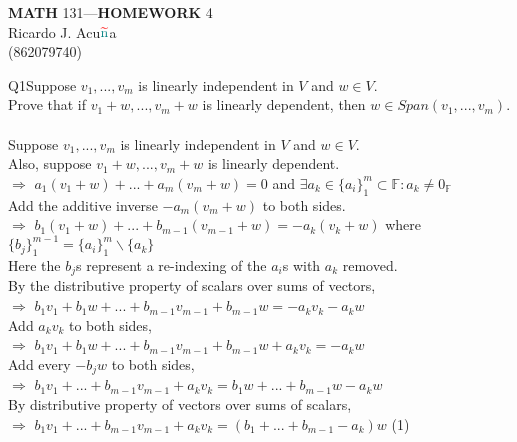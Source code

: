 \documentclass{article}
\begin{document}
\begin{center}
  \textbf{MATH} 131---\textbf{HOMEWORK} 4\\
  \color{red}R\color{teal}icardo
  \color{red}J\color{cyan}.
  \color{red}A\color{teal}cu$\color{red}{\widetilde{\color{teal}\text{n}}}$\color{teal}a\color{black}\\
  \color{teal}(\color{red}862079740\color{teal})\color{black}\\
\end{center}\vspace{1.618cm}

Q1\quad Suppose $v_1 , ... , v_m$ is linearly independent in $V$
and $w \in V$. \\Prove that if
$v_1 + w, ... , v_m + w$
is linearly dependent, then $w \in Span(v_1 , ... , v_m).$\\

\\
Suppose $v_1 , . . . , v_m$ is linearly independent in $V$
and $w \in V$.\\
Also, suppose $v_1 + w, ... , v_m + w$ is linearly dependent.\\
$\Rightarrow$ $a_1(v_1 + w) + ... + a_m(v_m + w) = 0$ and $\exists a_k \in \{a_i\}_{1}^{m} \subset \mathbb{F}: a_k \neq 0_{\mathbb{F}}$\\
Add the additive inverse $-a_m(v_m + w)$ to both sides.\\
$\Rightarrow$ $b_1(v_1 + w) + ... + b_{m-1}(v_{m-1} + w) = -a_k(v_k+ w)$ where $\{b_j\}_{1}^{m-1} = \{a_i\}_{1}^m \backslash{\{a_k\}}$\\
Here the $b_j$s represent a re-indexing of the $a_i$s with $a_k$ removed.\\

By the distributive property of scalars over sums of vectors,\\
$\Rightarrow$ $b_{1}v_1 + b_{1}w + ... + b_{m-1}v_{m-1} + b_{m-1}w = -a_kv_k -a_kw$\\
Add $a_kv_k$ to both sides,\\
$\Rightarrow$ $b_{1}v_1 + b_{1}w + ... + b_{m-1}v_{m-1} + b_{m-1}w +  a_kv_k = -a_kw$\\
Add every $-b_jw$ to both sides,\\
$\Rightarrow$ $b_{1}v_1+ ... + b_{m-1}v_{m-1} + a_kv_k = b_1w + ... + b_{m-1}w -a_kw$\\
By distributive property of vectors over sums of scalars,\\
$\Rightarrow$ $b_{1}v_1+ ... + b_{m-1}v_{m-1} + a_kv_k = (b_1 +
... +b_{m-1} -a_k)w$ (1)\\
\end{document}
